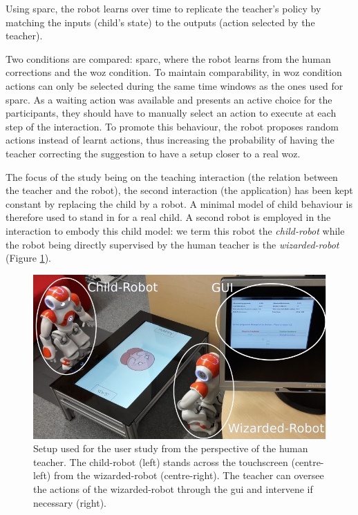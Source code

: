 Using \gls{sparc}, the robot learns over time to replicate the teacher's policy by matching the inputs (child's state) to the outputs (action selected by the teacher). 


Two conditions are compared: \gls{sparc}, where the robot learns from the human corrections and the \gls{woz} condition. To maintain comparability, in \gls{woz} condition actions can only be selected during the same time windows as the ones used for \gls{sparc}. As a waiting action was available and presents an active choice for the participants, they should have to manually select an action to execute at each step of the interaction. To promote this behaviour, the robot proposes random actions instead of learnt actions, thus increasing the probability of having the teacher correcting the suggestion to have a setup closer to a real \gls{woz}.

The focus of the study being on the teaching interaction (the relation between the teacher and the robot), the second interaction (the application) has been kept constant by replacing the child by a robot. A minimal model of child behaviour is therefore used to stand in for a real child. A second robot is employed in the interaction to embody this child model: we term this robot the \textit{child-robot} while the robot being directly supervised by the human teacher is the \textit{wizarded-robot} (Figure \ref{fig:woz_setup}).

\begin{figure}[ht]
	\centering
	\includegraphics[width=.9\textwidth]{setup_annotated.png}
	\caption{Setup used for the user study from the perspective of the human teacher. The child-robot (left) stands across the touchscreen (centre-left) from the wizarded-robot (centre-right). The teacher can oversee the actions of the wizarded-robot through the \gls{gui} and intervene if necessary (right).}
	\label{fig:woz_setup}
\end{figure}
		
